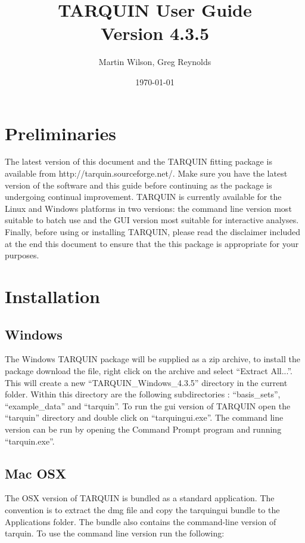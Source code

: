 \documentclass[a4paper,12pt]{article}
\newcommand{\ver}{4.3.5}
\begin{document}
\title{TARQUIN User Guide \\ Version \ver}
\author{Martin Wilson, Greg Reynolds}
\date{\today}

\maketitle

\tableofcontents

\pagebreak

\section{Preliminaries}
The latest version of this document and the TARQUIN fitting package is available from http://tarquin.sourceforge.net/. Make sure you have the latest version of the software and this guide before continuing as the package is undergoing continual improvement.  TARQUIN is currently available for the Linux and Windows platforms in two versions: the command line version most suitable to batch use and the GUI version most suitable for interactive analyses.  Finally, before using or installing TARQUIN, please read the disclaimer included at the end this document to ensure that the this package is appropriate for your purposes.

\section{Installation}
\subsection{Windows}
The Windows TARQUIN package will be supplied as a zip archive, to install the package download the file, right click on the archive and select ``Extract All...''.  This will create a new ``TARQUIN\_Windows\_\ver'' directory in the current folder.  Within this directory are the following subdirectories : ``basis\_sets'', ``example\_data'' and ``tarquin''.  To run the gui version of TARQUIN open the ``tarquin'' directory and double click on ``tarquingui.exe''.  The command line version can be run by opening the Command Prompt program and running ``tarquin.exe''.

\subsection{Mac OSX}
The OSX version of TARQUIN is bundled as a standard application. The convention is to extract the dmg file and copy the tarquingui bundle to the Applications folder. The bundle also contains the command-line version of tarquin. To use the command line version run the following:
\end{document}
